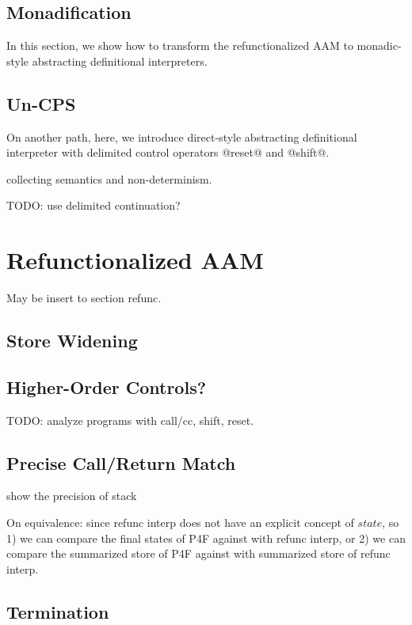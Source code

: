 \documentclass[acmsmall,review,anonymous]{acmart}\settopmatter{printfolios=true,printccs=false,printacmref=false}
\begin{document}
\subsection{Monadification} \label{monadify}

In this section, we show how to transform the refunctionalized AAM to monadic-style
abstracting definitional interpreters.

\subsection{Un-CPS} \label{uncps}

On another path, here, we introduce direct-style abstracting definitional interpreter 
with delimited control operators @reset@ and @shift@.

collecting semantics and non-determinism.

TODO: use delimited continuation? 

\section{Refunctionalized AAM}

May be insert to section refunc.

\subsection{Store Widening}

\subsection{Higher-Order Controls?}

TODO: analyze programs with call/cc, shift, reset.

\subsection{Precise Call/Return Match}

show the precision of stack

On equivalence: since refunc interp does not have an explicit concept of $state$,
so 1) we can compare the final states of P4F against with refunc interp,
or 2) we can compare the summarized store of P4F against with summarized store of refunc interp.

\subsection{Termination}
\end{document}
